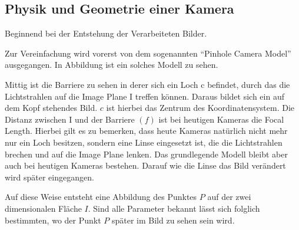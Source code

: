 \subsection{Physik und Geometrie einer Kamera}
\label{sec:camerageo}
Beginnend bei der Entstehung der Verarbeiteten Bilder. 

Zur Vereinfachung wird vorerst von dem sogenannten "`Pinhole Camera Model"' ausgegangen. In Abbildung  ist ein solches Modell zu sehen. 

Mittig ist die Barriere zu sehen in derer sich ein Loch c befindet, durch das die Lichtstrahlen auf die Image Plane I treffen können. Daraus bildet sich ein auf dem Kopf stehendes Bild. $c$ ist hierbei das Zentrum des Koordinatensystem.
Die Distanz zwischen I und der Barriere $(f)$ ist bei heutigen Kameras die Focal Length. Hierbei gilt es zu bemerken, dass heute Kameras natürlich nicht mehr nur ein Loch besitzen, sondern eine Linse eingesetzt ist, die die Lichtstrahlen brechen und auf die Image Plane lenken. Das grundlegende Modell bleibt aber auch bei heutigen Kameras bestehen. Darauf wie die Linse das Bild verändert wird später eingegangen. 

Auf diese Weise entsteht eine Abbildung des Punktes $P$ auf der zwei dimensionalen Fläche $I$. Sind alle Parameter bekannt lässt sich folglich bestimmten, wo der Punkt $P$ später im Bild zu sehen sein wird. 

